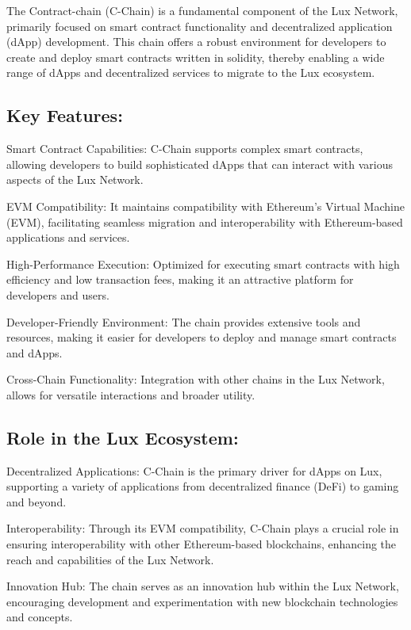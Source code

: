 \documentclass[11pt]{article}
\begin{document}
The Contract-chain (C-Chain) is a fundamental component of the Lux Network, primarily focused on smart contract functionality and decentralized application (dApp) development. This chain offers a robust environment for developers to create and deploy smart contracts written in solidity, thereby enabling a wide range of dApps and decentralized services to migrate to the Lux ecosystem.


\subsection{Key Features:}

Smart Contract Capabilities: C-Chain supports complex smart contracts, allowing developers to build sophisticated dApps that can interact with various aspects of the Lux Network.


EVM Compatibility: It maintains compatibility with Ethereum's Virtual Machine (EVM), facilitating seamless migration and interoperability with Ethereum-based applications and services.


High-Performance Execution: Optimized for executing smart contracts with high efficiency and low transaction fees, making it an attractive platform for developers and users.


Developer-Friendly Environment: The chain provides extensive tools and resources, making it easier for developers to deploy and manage smart contracts and dApps.


Cross-Chain Functionality: Integration with other chains in the Lux Network, allows for versatile interactions and broader utility.


\subsection{Role in the Lux Ecosystem:}

Decentralized Applications: C-Chain is the primary driver for dApps on Lux, supporting a variety of applications from decentralized finance (DeFi) to gaming and beyond.


Interoperability: Through its EVM compatibility, C-Chain plays a crucial role in ensuring interoperability with other Ethereum-based blockchains, enhancing the reach and capabilities of the Lux Network.


Innovation Hub: The chain serves as an innovation hub within the Lux Network, encouraging development and experimentation with new blockchain technologies and concepts.
\end{document}
